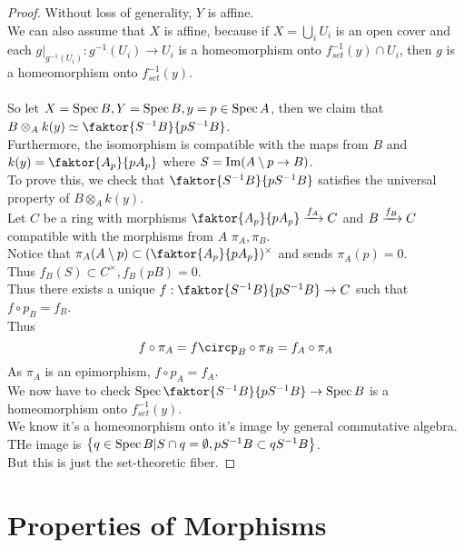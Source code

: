 \documentclass[../main.tex]{subfiles}
\begin{document}
\begin{proof}
Without loss of generality, $Y$ is affine.\\
We can also assume that $X$ is affine, because if $X= \bigcup_i U_i$ is an open cover and each $g|_{g^{-1}( U_i) } : g^{-1}( U_i) \to U_i$ is a homeomorphism onto $f_{set}^{-1}( y) \cap U_i$, then $g$ is a homeomorphism onto $f_{set} ^{-1}( y) $.\\\\
So let $X= \operatorname{Spec} B, Y = \operatorname{Spec} B, y = p \in \operatorname{Spec} A$, then we claim that $B\otimes_A k( y) \simeq \faktor{S^{-1}B}{p S^{-1}B} $.\\
Furthermore, the isomorphism is compatible with the maps from $B$ and $k( y) = \faktor{A_p }{p A_p}$ where $S= \operatorname{Im} ( A\setminus p \to B) $.\\
To prove this, we check that $ \faktor{S^{-1}B}{p S^{-1}B}$ satisfies the universal property of $B \otimes_A k( y) $.\\
Let $C$ be a ring with morphisms $ \faktor{A_p}{p A_p}\xto{f_A} C$ and $B \xrightarrow{f_B} C$ compatible with the morphisms from $A$ $\pi_A,\pi_B$.\\
Notice that $\pi_A( A\setminus p) \subset ( \faktor{A_p}{pA_p})^{\times} $ and sends $\pi_A( p) =0$.\\
Thus $f_B( S) \subset C^{\times}, f_B( pB) =0$.\\
Thus there exists a unique $f: \faktor{S^{-1}B}{p S^{-1}B}\to C$ such that $f\circ p_B = f_B$.\\
Thus
\[ 
f\circ\pi_A = f\circp_B \circ \pi_B = f_A\circ \pi_A
\]
As $\pi_A$ is an epimorphism, $f\circ p_A = f_A $.\\

We now have to check $\spec \faktor{S^{-1}B}{p S^{-1}B}\to \spec B$ is a homeomorphism onto $f_{set}^{-1}( y) $.\\

We know it's a homeomorphism onto it's image by general commutative algebra.\\
THe image is $ \left\{ q\in \operatorname{Spec} B| S\cap q=\emptyset, pS^{-1}B \subset q S^{-1}B  \right\} $.\\
But this is just the set-theoretic fiber.
\end{proof}
\section{Properties of Morphisms}
\end{document}
